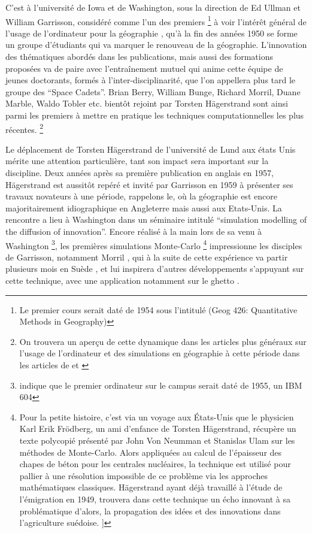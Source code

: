 C'est à l'université de Iowa et de Washington, sous la direction de Ed Ullman et William Garrisson, considéré comme l'un des premiers \footnote {Le premier cours serait daté de 1954 sous l'intitulé (Geog 426: Quantitative Methods in Geography) } à voir l'intérêt général de l'usage de l'ordinateur pour la géographie , qu'à la fin des années 1950 se forme un groupe d'étudiants qui va marquer le renouveau de la géographie. L'innovation des thématiques abordés dans les publications, mais aussi des formations proposées va de paire avec l’entraînement mutuel qui anime cette équipe de jeunes doctorants, formés à l'inter-disciplinarité, que l'on appellera plus tard le groupe des \foreignquote{english}{Space Cadets}. Brian Berry, William Bunge, Richard Morril, Duane Marble, Waldo Tobler etc. bientôt rejoint par Torsten Hägerstrand sont ainsi parmi les premiers à mettre en pratique les techniques computationnelles les plus récentes. \footnote{ On trouvera un aperçu de cette dynamique dans les articles plus généraux sur l'usage de l'ordinateur et des simulations en géographie à cette période dans les articles de \textcite{Haggett1969} et \textcite{Marble1972}}

Le déplacement de Torsten Hägerstrand de l'université de Lund aux états Unis mérite une attention particulière, tant son impact sera important sur la discipline. Deux années après sa première publication en anglais en 1957, Hägerstrand est aussitôt repéré et invité par Garrisson en 1959 à présenter ses travaux novateurs à une période, rappelons le, où la géographie est encore majoritairement idiographique en Angleterre mais aussi aux Etats-Unis. La rencontre a lieu à Washington dans un séminaire intitulé \foreignquote{english}{simulation modelling of the diffusion of innovation}. Encore réalisé à la main lors de sa venu à Washington \footnote{ \textcite{Barnes2006} indique que le premier ordinateur sur le campus serait daté de 1955, un IBM 604}, les premières simulations Monte-Carlo \footnote{Pour la petite histoire, c'est via un voyage aux États-Unis que le physicien Karl Erik Frödberg, un ami d'enfance de Torsten Hägerstrand, récupère un texte polycopié présenté par John Von Neumman et Stanislas Ulam sur les méthodes de Monte-Carlo. Alors appliquées au calcul de l'épaisseur des chapes de béton pour les centrales nucléaires, la technique est utilisé pour pallier à une résolution impossible de ce problème via les approches mathématiques classiques.  Hägerstrand ayant déjà travaillé à l'étude de l'émigration en 1949, trouvera dans cette technique un écho innovant à sa problématique d'alors, la propagation des idées et des innovations dans l'agriculture suédoise. \autocite[26-28]{Gould2004}]} impressionne les disciples de Garrisson, notamment Morril \autocite[120]{Unwin1992}, qui à la suite de cette expérience va partir plusieurs mois en Suède \autocite{Morril2005}, et lui inspirera d'autres développements s'appuyant sur cette technique, avec une application notamment sur le ghetto \textcite{Marble1972}.

